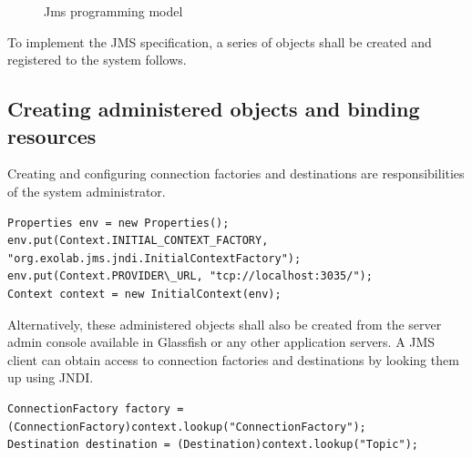 \documentclass[9pt,twocolumn,twoside]{../../styles/osajnl}
\begin{document}
\begin{figure}[htbp]
\centering
{}
\caption{\cite{www-jms-fischli-article} Jms programming model}
\label{fig:JMS Programming Objects}
\end{figure}

To implement the JMS specification, a series of objects shall be
created and registered to the system follows.

\subsection{Creating administered objects and binding resources}

Creating and configuring connection factories and destinations are
responsibilities of the system administrator.

\begin{lstlisting}
Properties env = new Properties();
env.put(Context.INITIAL_CONTEXT_FACTORY,
"org.exolab.jms.jndi.InitialContextFactory");
env.put(Context.PROVIDER\_URL, "tcp://localhost:3035/");
Context context = new InitialContext(env);
\end{lstlisting}

Alternatively, these administered objects shall also be created from
the server admin console available in Glassfish or any other
application servers.  A JMS client can obtain access to connection
factories and destinations by looking them up using JNDI.

\begin{lstlisting}
ConnectionFactory factory =
(ConnectionFactory)context.lookup("ConnectionFactory"); 
Destination destination = (Destination)context.lookup("Topic");
\end{lstlisting}
\end{document}
